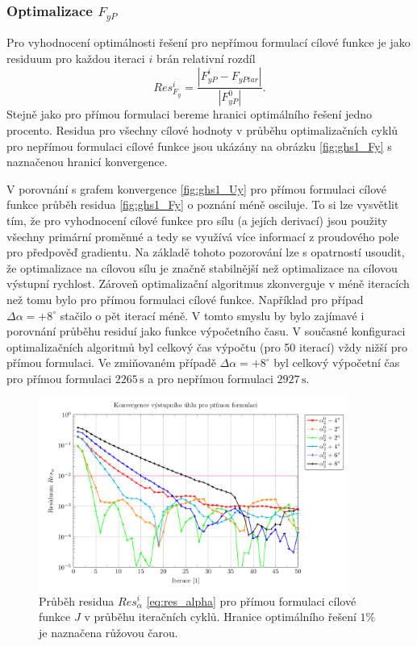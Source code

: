 \subsubsection{Optimalizace $ F_{yP} $}

Pro vyhodnocení optimálnosti řešení pro nepřímou formulací cílové funkce je jako residuum pro každou iteraci $ i $ brán relativní rozdíl
\begin{equation}\label{eq:res_fy}
Res_{F_{y}}^i=\dfrac{|F_{yP}^i-F_{yPtar}|}{|F_{yP}^0|}.
\end{equation}
Stejně jako pro přímou formulaci bereme hranici optimálního řešení jedno procento. Residua pro všechny cílové hodnoty v průběhu optimalizačních cyklů pro nepřímou formulaci cílové funkce jsou ukázány na obrázku \ref{fig:ghs1_Fy} s naznačenou hranicí konvergence. 

V porovnání s grafem konvergence \ref{fig:ghs1_Uy} pro přímou formulaci cílové funkce průběh residua \ref{fig:ghs1_Fy} o poznání méně osciluje. To si lze vysvětlit tím, že pro vyhodnocení cílové funkce pro sílu (a jejích derivací) jsou použity všechny primární proměnné a tedy se využívá více informací z proudového pole pro předpověď gradientu. Na základě tohoto pozorování lze s opatrností usoudit, že optimalizace na cílovou sílu je značně stabilnější než optimalizace na cílovou výstupní rychlost. Zároveň optimalizační algoritmus zkonverguje v méně iteracích než tomu bylo pro přímou formulaci cílové funkce. Například pro případ $ \Delta \alpha = +8^\circ $ stačilo o pět iterací méně. V tomto smyslu by bylo zajímavé i porovnání průběhu residuí jako funkce výpočetního času. V současné konfiguraci optimalizačních algoritmů byl celkový čas výpočtu (pro 50 iterací) vždy nižší pro přímou formulaci. Ve zmiňovaném případě $ \Delta \alpha = +8^\circ $ byl celkový výpočetní čas pro přímou formulaci $ 2265 \,\mathrm{s} $ a pro nepřímou formulaci $ 2927 \,\mathrm{s} $.

\begin{figure}[H]
	\includegraphics[width=0.9\textwidth]{img/UyA.pdf}
	\caption[Průběh residua $ Res_{\alpha}^i $, přímá formulace]{Průběh residua $ Res_{\alpha}^i $ \ref{eq:res_alpha} pro přímou formulaci cílové funkce $ J $ v průběhu iteračních cyklů. Hranice optimálního řešení $ 1\% $ je naznačena růžovou čarou.}
	\label{fig:ghs1_UyA}
\end{figure}

